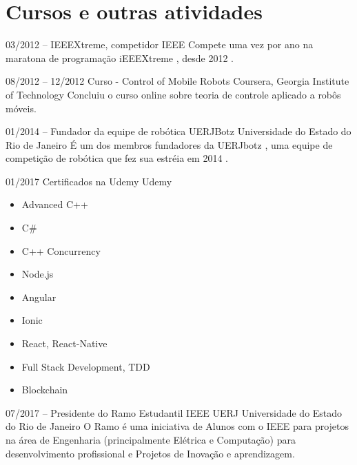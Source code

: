 \documentclass[]{friggeri-cv} %
\begin{document}
\vspace{1cm}


\section{Cursos e outras atividades}

\begin{entrylist}



\entry
{03/2012 -- }
{\hspace{.15cm}IEEEXtreme, competidor}
{IEEE}
{Compete uma vez por ano na maratona de programação iEEEXtreme , desde 2012 .}

\entry
{08/2012 -- 12/2012}
{\hspace{.15cm}Curso - Control of Mobile Robots}
{Coursera, Georgia Institute of Technology}
{Concluiu o curso online sobre teoria de controle aplicado a robôs móveis.}

\entry
{01/2014 -- }
{\hspace{.15cm}Fundador da equipe de robótica UERJBotz}
{Universidade do Estado do Rio de Janeiro}
{É um dos membros fundadores da UERJbotz , uma equipe de competição de robótica que fez sua estréia em 2014 .}

\entry
{01/2017}
{\hspace{.15cm}Certificados na Udemy}
{Udemy}
{\begin{itemize}
\item Advanced C++
\item C#
\item C++ Concurrency
\item Node.js
\item Angular
\item Ionic
\item React, React-Native
\item Full Stack Development, TDD
\item Blockchain
\end{itemize}}

\entry
{07/2017 -- }
{\hspace{.15cm} Presidente do Ramo Estudantil IEEE UERJ}
{Universidade do Estado do Rio de Janeiro}
{O Ramo é uma iniciativa de Alunos com o IEEE para projetos na área de Engenharia (principalmente Elétrica e Computação) para desenvolvimento profissional e Projetos de Inovação e aprendizagem.}


\end{entrylist}
\end{document}
